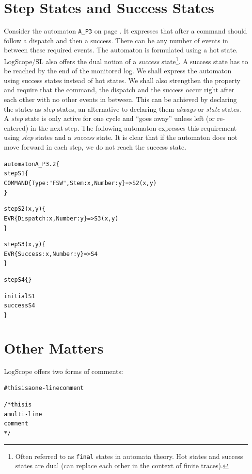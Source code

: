 \documentclass{report}
\newcommand{\logscope}{{\sc LogScope}}
\newcommand{\logscopeSL}{{\sc LogScope/SL}}
\newenvironment{code}[1] %
{
\vspace{0.5cm}
\begin{center}
\begin{Sbox}
\begin{minipage}{11cm}
\begin{alltt}
{\bf\em #1}
}
{
\end{alltt}
\end{minipage}
\end{Sbox}
\setlength{\fboxsep}{8pt}
\fbox{\TheSbox}
\end{center}
\vspace{0.5cm}
}
\begin{document}
\section{Step States and Success States}

Consider the automaton {\tt A\_P3} on page \pageref{automaton:p3}. It expresses that after a command
should follow a dispatch and then a success. There can be any number of events in between these
required events. The automaton is formulated using a hot state.
\logscopeSL{} also offers the dual notion of a {\em success} state\footnote{Often referred to as {\tt final} states
in automata theory. Hot states and success states are dual (can replace each other in the context of finite
traces).}. A success state has to be reached by the end of
the monitored log. We shall express the automaton using success states instead of hot states. We shall
also strengthen the property and require that the command, the dispatch and the success occur right after each
other with no other events in between. This can be achieved by declaring the states as {\em step} states, 
an alternative to declaring them {\em always} or {\em state} states. A {\em step} state is only active for one
cycle and ``goes away'' unless left (or re-entered) in the next step. The following automaton expresses this
requirement using {\em step} states and a {\em success} state. It is clear that if the automaton does not
move forward in each step, we do not reach the success state.

\begin{code}{}
automaton A_P3.2 \{
  step S1 \{
    COMMAND\{Type : "FSW",Stem : x, Number : y\} => S2(x,y)
  \}

  step S2(x,y) \{
    EVR\{Dispatch : x,Number : y\} => S3(x,y)
  \}

  step S3(x,y) \{
    EVR\{Success : x,Number : y\} => S4
  \}

  step S4 \{\}

  initial S1
  success S4
\}
\end{code}

\section{Other Matters}

%

\logscope{} offers two forms of comments:

\begin{code}{}
# this is a one-line comment

/* this is 
a multi-line
comment
*/
\end{code}
\end{document}
